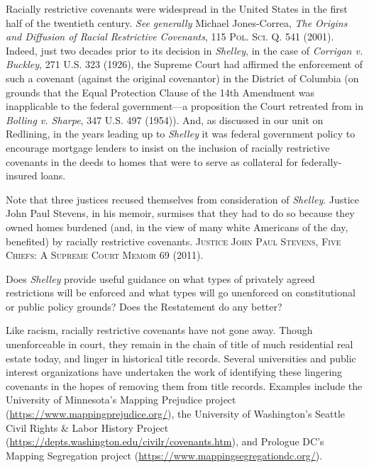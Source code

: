 
\item Racially restrictive covenants were widespread in the United States in the
first half of the twentieth century. \textit{See generally} Michael
Jones-Correa, \textit{The Origins and Diffusion of Racial Restrictive
Covenants}, 115 \textsc{Pol. Sci. Q.} 541 (2001). Indeed, just two decades prior
to its decision in \textit{Shelley}, in the case of \textit{Corrigan v.
Buckley}, 271 U.S. 323 (1926), the Supreme Court had affirmed the enforcement of
such a covenant (against the original covenantor) in the District of Columbia
(on grounds that the Equal Protection Clause of the 14th Amendment was
inapplicable to the federal government---a proposition the Court retreated from
in \textit{Bolling v. Sharpe}, 347 U.S. 497 (1954)). And, as discussed in our
unit on Redlining, in the years leading up to
\textit{Shelley} it was federal government policy to encourage mortgage lenders
to insist on the inclusion of racially restrictive covenants in the deeds to
homes that were to serve as collateral for federally-insured loans.


Note that three justices recused themselves from consideration of
\textit{Shelley}. Justice John Paul Stevens, in his memoir, surmises that they
had to do so because they owned homes burdened (and, in the view of many white
Americans of the day, benefited) by racially restrictive covenants.
\textsc{Justice John Paul Stevens, Five Chiefs: A Supreme Court Memoir} 69
(2011).



\item Does \textit{Shelley} provide useful guidance on what types of privately
agreed restrictions will be enforced and what types will go unenforced on
constitutional or public policy grounds? Does the Restatement do any better?

\item Like racism, racially restrictive covenants have not gone away. Though
unenforceable in court, they remain in the chain of title of much residential
real estate today, and linger in historical title records. Several universities
and public interest organizations have undertaken the work of identifying these
lingering covenants in the hopes of removing them from title records. Examples
include the University of Minnesota's Mapping Prejudice project
(\url{https://www.mappingprejudice.org/}), the University of Washington's
Seattle Civil Rights \& Labor History Project
(\url{https://depts.washington.edu/civilr/covenants.htm}), and Prologue DC's
Mapping Segregation project (\url{https://www.mappingsegregationdc.org/}). 

